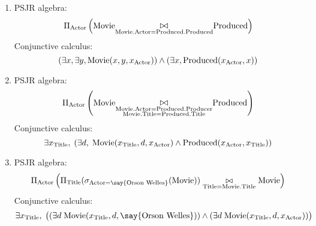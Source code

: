 \documentclass{../../cs-classes/cs-classes}
\newcommand*{\titl}{\textnormal{Title}}
\newcommand*{\movie}{\textnormal{Movie}}
\newcommand*{\actor}{\textnormal{Actor}}
\newcommand*{\produced}{\textnormal{Produced}}
\newcommand*{\producer}{\textnormal{Producer}}
\newcommand{\constant}[1]{\textnormal{\say{#1}}}
\begin{document}
\begin{exercise}
\begin{enumerate}
        \item PSJR algebra:
        \begin{equation*}
            \Pi_{\actor}\left(\movie\underset{\movie.\actor=\produced.\produced}{\mathlarger\bowtie}\produced\right)
        \end{equation*}
        Conjunctive calculus:
        \begin{equation*}
            (\exists x, \exists y, \movie(x, y, x_{\actor})) \land (\exists x, \produced(x_{\actor}, x))
        \end{equation*}

        \item PSJR algebra:
        \begin{equation*}
            \Pi_{\actor}\left(\movie\underset{\substack{\movie.\actor=\produced.\producer\\\movie.\titl=\produced.\titl}}{\mathlarger\bowtie}\produced\right)
        \end{equation*}
        Conjunctive calculus:
        \begin{equation*}
            \exists x_{\titl}, \; (\exists d, \; \movie(x_{\titl}, d, x_{\actor}) \land \produced(x_{\actor}, x_{\titl}))
        \end{equation*}

        \item PSJR algebra:
        \begin{equation*}
           \Pi_{\actor}\left(\Pi_{\titl}(\sigma_{\actor=\constant{Orson Welles}}(\movie))\underset{\titl=\movie.\titl}{\bowtie}\movie\right)
        \end{equation*}
        Conjunctive calculus:
        \begin{equation*}
            \exists x_{\titl},\; \big((\exists d \; \movie(x_{\titl}, d, \constant{Orson Welles})) \land (\exists d \; \movie(x_{\titl}, d, x_{\actor}))\big)
        \end{equation*}


\end{enumerate}
\end{exercise}
\end{document}
